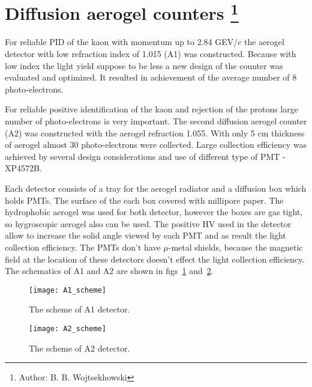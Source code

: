 {\section[Diffusion aerogel counters]{Diffusion aerogel counters 
\footnote{Author: B. B. Wojtsekhowski }
}

For reliable PID of the kaon with momentum up to 2.84 GEV/$c$ 
the aerogel detector with low refraction index of 1.015 (A1) was constructed.
Because with low index the light yield suppose to be less a new design
of the counter was evaluated and optimized. It resulted in
achievement of the average number of 8 photo-electrons. 

For reliable positive identification of the kaon and rejection of the protons 
large number of photo-electrons is very important. The second  diffusion
aerogel counter (A2) was constructed with the aerogel refraction 1.055. 
With only 5 cm thickness of aerogel almost 30 photo-electrons were collected. 
Large collection efficiency was achieved by several design considerations and
use of different type of PMT - XP4572B.

Each detector consists of a tray for the aerogel radiator and a diffusion box
which holds PMTs. The surface of the each box covered with millipore
paper. The hydrophobic aerogel was used for both detector, however the boxes
are gas tight, so hygroscopic aerogel also can be used. The positive HV 
used in the detector allow to increase the solid angle viewed by each PMT
and as result the light collection efficiency. The PMTs don't have
$\mu$-metal shields, because the magnetic field at the location of these
detectors  doesn't effect the light collection efficiency.
The schematics of A1 and A2 are shown in figs~\ref{fig:A1_scheme} 
and~\ref{fig:A2_scheme}.

\begin{figure}[htb]
\begin{center}
  \texttt{[image: A1\_scheme]}
\end{center}
\caption[The scheme of A1 detector] {The scheme of A1 detector.}
\label{fig:A1_scheme}
\end{figure}
%
\begin{figure}[htb]
\begin{center}
  \texttt{[image: A2\_scheme]}
\end{center}
\caption[The scheme of A2 detector] {The scheme of A2 detector.}
\label{fig:A2_scheme}
\end{figure}
%
%
} %

